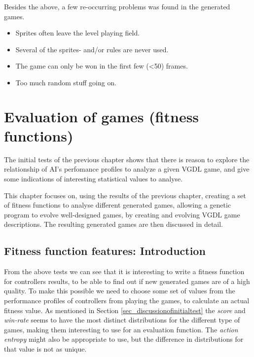 \documentclass[a4paper,titlepage,final]{report}
\begin{document}
Besides the above, a few re-occurring problems was found in the generated games.

\begin{itemize}
\item Sprites often leave the level playing field.
\item Several of the sprites- and/or rules are never used.
\item The game can only be won in the first few (<50) frames.
\item Too much random stuff going on.
\end{itemize}





\chapter{Evaluation of games (fitness functions)}
\label{ch_task2}

The initial tests of the previous chapter shows that there is reason to explore the relationship of AI's perfomance profiles to analyze a given VGDL game, and give some indications of interesting statistical values to analyse.

This chapter focuses on, using the results of the previous chapter, creating a set of fitness functions to analyse different generated games, allowing a genetic program to evolve well-designed games, by creating and evolving VGDL game descriptions.
The resulting generated games are then discussed in detail.

\section{Fitness function features: Introduction}
\label{sec_task2intro}
From the above tests we can see that it is interesting to write a fitness function for controllers results, to be able to find out if new generated games are of a high quality.
To make this possible we need to choose some set of values from the performance profiles of controllers from playing the games, to calculate an actual fitness value.
As mentioned in Section \ref{sec_discussionofinitialtest} the \textit{score} and \textit{win-rate} seems to have the most distinct distributions for the different type of games, making them interesting to use for an evaluation function.
The \textit{action entropy} might also be appropriate to use, but the difference in distributions for that value is not as unique.
\end{document}
